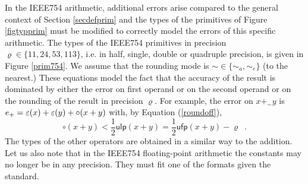 In the IEEE754 arithmetic, additional errors arise compared to the general context of Section \ref{secdefprim} and 
the types of the primitives of Figure \ref{figtypprim}
must be modified to correctly model the errors of this specific arithmetic.
The types of the IEEE754 primitives in precision $\varrho\in \{11,24,53,113\}$, i.e. in half, single,
double or quadruple precision, is given in Figure \ref{prim754}. We assume that the
rounding mode is  $\sim\in\{\sim_a,\sim_e\}$ (to the nearest.)
These equations model the fact that the accuracy of the result is dominated by either the error on
first operand or on the second operand or on the rounding of the result in precision $\varrho$.
For example, the error on $x+_\sim y$ is $e_+=\varepsilon(x)+\varepsilon(y)+\circ(x+y)$ with, by Equation (\ref{roundoff}),
\begin{equation}
\circ(x+y)< \frac{1}{2}\mathsf{ulp}(x+y)=\frac{1}{2}\mathsf{ufp}(x+y)-\varrho\enspace .
\end{equation}
The types of the other operators are obtained in a similar way to the addition.
Let us also note that in the IEEE754 floating-point arithmetic the constants may no longer
be in any precision. They must fit one of the formats given the standard.



